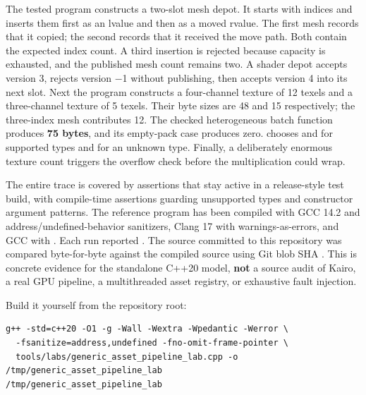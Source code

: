 \hypertarget{05-engine-i-ch005-one-complete-trace-and-a-reconstruction-challenge}{}

The tested program constructs a two-slot mesh depot. It starts with indices  and inserts them first as an lvalue and then as a moved rvalue. The first mesh records that it copied; the second records that it received the move path. Both contain the expected index count. A third insertion is rejected because capacity is exhausted, and the published mesh count remains two. A shader depot accepts version 3, rejects version −1 without publishing, then accepts version 4 into its next slot. Next the program constructs a four-channel texture of 12 texels and a three-channel texture of 5 texels. Their byte sizes are 48 and 15 respectively; the three-index mesh contributes 12. The checked heterogeneous batch function produces \textbf{75 bytes}, and its empty-pack case produces zero.  chooses  and  for supported types and  for an unknown type. Finally, a deliberately enormous texture count triggers the overflow check before the multiplication could wrap.

The entire trace is covered by assertions that stay active in a release-style test build, with compile-time assertions guarding unsupported types and constructor argument patterns. The reference program has been compiled with GCC 14.2 and address/undefined-behavior sanitizers, Clang 17 with warnings-as-errors, and GCC with . Each run reported . The source committed to this repository was compared byte-for-byte against the compiled source using Git blob SHA . This is concrete evidence for the standalone C++20 model, \textbf{not} a source audit of Kairo, a real GPU pipeline, a multithreaded asset registry, or exhaustive fault injection.

Build it yourself from the repository root:

\begin{verbatim}
g++ -std=c++20 -O1 -g -Wall -Wextra -Wpedantic -Werror \
  -fsanitize=address,undefined -fno-omit-frame-pointer \
  tools/labs/generic_asset_pipeline_lab.cpp -o /tmp/generic_asset_pipeline_lab
/tmp/generic_asset_pipeline_lab
\end{verbatim}

